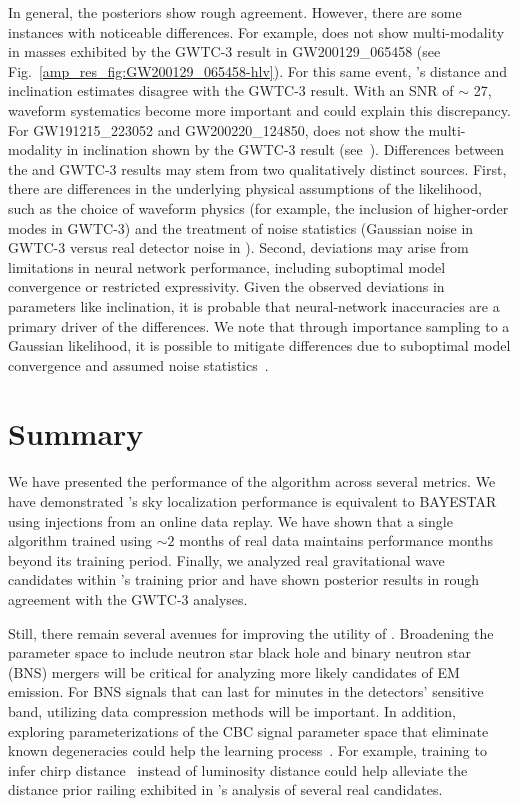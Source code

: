 \begin{refsection}
In general, the posteriors show rough agreement. 
However, there are some instances with noticeable differences. 
For example, \amplfi does not show multi-modality in masses exhibited by the GWTC-3 result in GW200129\_065458 (see Fig.~\ref{amp_res_fig:GW200129_065458-hlv}). 
For this same event, \amplfi's distance and inclination estimates disagree with the GWTC-3 result. 
With an SNR of $\sim$ 27, waveform systematics become more important and could explain this discrepancy. 
For GW191215\_223052 and GW200220\_124850, \amplfi does not show the multi-modality in inclination shown by the GWTC-3 result (see~). 
Differences between the \amplfi and GWTC-3 results may stem from two qualitatively distinct sources. 
First, there are differences in the underlying physical assumptions of the likelihood, such as the choice of waveform physics (for example, the inclusion of higher-order modes in GWTC-3) and the treatment of noise statistics (Gaussian noise in GWTC-3 versus real detector noise in \amplfi). 
Second, deviations may arise from limitations in neural network performance, including suboptimal model convergence or restricted expressivity. 
Given the observed deviations in parameters like inclination, it is probable that neural-network inaccuracies are a primary driver of the differences. 
We note that through importance sampling to a Gaussian likelihood, it is possible to mitigate differences due to suboptimal model convergence and assumed noise statistics~\cite{Dax_2023}.

\section{Summary}
We have presented the performance of the \amplfi algorithm across several metrics. 
We have demonstrated \amplfi's sky localization performance is equivalent to BAYESTAR using injections from an online data replay. 
We have shown that a single \amplfi algorithm trained using $\sim 2$ months of real data maintains performance months beyond its training period. 
Finally, we analyzed real gravitational wave candidates within \amplfi's training prior and have shown posterior results in rough agreement with the GWTC-3 analyses. 

Still, there remain several avenues for improving the utility of \amplfi.
Broadening the parameter space to include neutron star black hole and binary neutron star (BNS) mergers will be critical for analyzing more likely candidates of EM emission. 
For BNS signals that can last for minutes in the detectors' sensitive band, utilizing data compression methods will be important. 
In addition, exploring parameterizations of the CBC signal parameter space that eliminate known degeneracies could help the learning process~\cite{Roulet_2022}. 
For example, training \amplfi to infer chirp distance~\cite{Brady_2008} instead of luminosity distance could help alleviate the distance prior railing exhibited in \amplfi's analysis of several real candidates.



\end{refsection}
